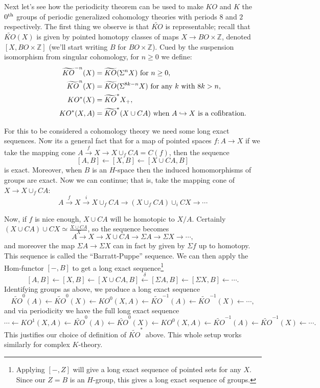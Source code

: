 \documentclass{article}
\newcommand{\Z}{\mathbb{Z}}
\newcommand{\Suspend}{\Sigma}
\newcommand{\from}{\leftarrow}
\begin{document}
Next let's see how the periodicity theorem can be used to make $KO$ and $K$ the $0^\textup{th}$ groups of periodic generalized cohomology theories with periods $8$ and $2$ respectively.  The first thing we observe is that $\widetilde{KO}$ is representable; recall that $\widetilde{KO}(X)$ is given by pointed homotopy classes of maps $X \to BO \times \Z$, denoted $[X, BO \times \Z]$ (we'll start writing $B$ for $BO \times \Z$).  Cued by the suspension isomorphism from singular cohomology, for $n \ge 0$ we define:
\begin{align*}
\qquad\qquad\qquad
\widetilde{KO}^{-n} (X) & = \widetilde{KO}(\Suspend^n X)\hbox{\ for $n\geq0$}, \\
\widetilde{KO}^n(X) & = \widetilde{KO}(\Suspend^{8k-n}X) \hbox{\ for any $k$ with $8k > n$}, \\
KO^*(X) &= \widetilde{KO}^* X_+, \\
KO^*(X, A) & = \widetilde{KO}^*(X \cup CA) \textup{\ when $A\hookrightarrow X$ is a cofibration.}
\end{align*}

For this to be considered a cohomology theory we need some long exact sequences.  Now its a general fact that for a map of pointed spaces $f: A \to X$ if we take the mapping cone $A \stackrel{f}{\to} X \to X \cup_f CA = C(f)$, then the sequence
\[
[A, B] \from [X, B] \from [X \cup CA, B]
\]
is exact.  Moreover, when $B$ is an $H$-space then the induced homomorphisms of groups are exact.  Now we can continue; that is, take the mapping cone of $X \to X \cup_f CA$:
\[
A \stackrel{f}{\to} X \stackrel{i}{\to} X \cup_f CA \to (X \cup_f CA) \cup_i CX \to \cdots
\]

Now, if $f$ is nice enough, $X \cup CA$ will be homotopic to $X / A$.  Certainly $(X \cup CA) \cup CX \simeq \frac{X \cup CA}{X}$, so the sequence becomes
\[
A \to X \to X \cup CA \to \Suspend A \to \Suspend X \to \cdots
,\]
and moreover the map $\Suspend A \to \Suspend X$ can in fact by given by $\Sigma f$ up to homotopy.  This sequence is called the ``Barratt-Puppe'' sequence.  We can then apply the Hom-functor $[-, B]$ to get a long exact sequence\footnote{Applying $[-, Z]$ will give a long exact sequence of pointed sets for any $X$.  Since our $Z = B$ is an $H$-group, this gives a long exact sequence of groups.}
\[
[A, B] \from [X, B] \from [X \cup CA, B] \stackrel{\delta}{\from} [\Suspend A, B] \from [\Suspend X, B] \from \cdots
.\]
Identifying groups as above, we produce a long exact sequence
\[
\widetilde{KO}^0 (A) \from \widetilde{KO}^0(X) \from KO^0(X, A) \from \widetilde{KO}^{-1}(A) \from \widetilde{KO}^{-1}(X) \from \cdots
,\]
and via periodicity we have the full long exact sequence
\[
\cdots \from KO^1(X, A) \from \widetilde{KO}^0 (A) \from \widetilde{KO}^0(X) \from KO^0(X, A) \from \widetilde{KO}^{-1}(A) \from \widetilde{KO}^{-1}(X) \from \cdots
.\]
This justifies our choice of definition of $\widetilde{KO}^*$ above.  This whole setup works similarly for complex $K$-theory.
\end{document}
